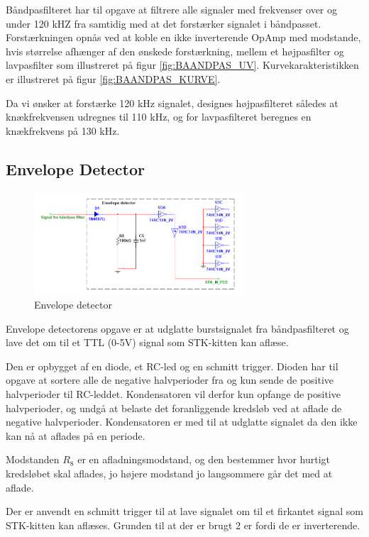Båndpasfilteret har til opgave at filtrere alle signaler med frekvenser over og under 120 kHZ fra samtidig med at det forstærker signalet i båndpasset. Forstærkningen opnås ved at koble en ikke inverterende OpAmp med modstande, hvis størrelse afhænger af den ønskede forstærkning, mellem et højpasfilter og lavpasfilter som illustreret på figur \ref{fig:BAANDPAS_UV}. Kurvekarakteristikken er illustreret på figur \ref{fig:BAANDPAS_KURVE}.

Da vi ønsker at forstærke 120 kHz signalet, designes højpasfilteret således at knækfrekvensen udregnes til 110 kHz, og for lavpasfilteret beregnes en knækfrekvens på 130 kHz.

\subsection{Envelope Detector}

\begin{figure}[htbp]
	\centering
	\includegraphics[width=0.70\textwidth]{billeder/HWdesign/ED_MV.png}
	\caption{Envelope detector}
	\label{fig:ED_MV}
\end{figure}

Envelope detectorens opgave er at udglatte burstsignalet fra båndpasfilteret og lave det om til et TTL (0-5V) signal som STK-kitten kan aflæse.

Den er opbygget af en diode, et RC-led og en schmitt trigger. Dioden har til opgave at sortere alle de negative halvperioder fra og kun sende de positive halvperioder til RC-leddet. Kondensatoren vil derfor kun opfange de positive halvperioder, og undgå at belaste det foranliggende kredsløb ved at aflade de negative halvperioder. Kondensatoren er med til at udglatte signalet da den ikke kan nå at aflades på en periode.

Modstanden $R_8$ er en afladningsmodstand, og den bestemmer hvor hurtigt kredsløbet skal aflades, jo højere modstand jo langsommere går det med at aflade.

Der er anvendt en schmitt trigger til at lave signalet om til et firkantet signal som STK-kitten kan aflæses. Grunden til at der er brugt 2 er fordi de er inverterende.
\newpage

